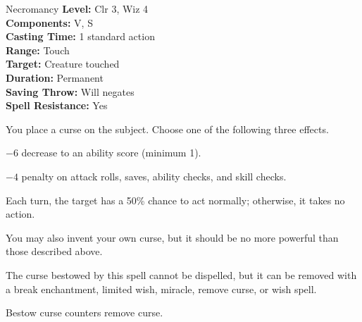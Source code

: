{Necromancy}
{
	\textbf{Level:}
	Clr 3, Wiz 4\\
	\textbf{Components:}
	V, S\\
	\textbf{Casting Time:}
	1 standard action\\
	\textbf{Range:}
	Touch\\
	\textbf{Target:}
	Creature touched\\
	\textbf{Duration:}
	Permanent\\
	\textbf{Saving Throw:}
	Will negates\\
	\textbf{Spell Resistance:}
	Yes\\
}
{
	You place a curse on the subject. Choose one of the following three effects.
\begin{itemize*}
\item $-6$ decrease to an ability score (minimum 1).
\item $-4$ penalty on attack rolls, saves, ability checks, and skill checks.
\item Each turn, the target has a 50\% chance to act normally; otherwise, it takes no action.
\end{itemize*}

	You may also invent your own curse, but it should be no more powerful than those described above.

	The curse bestowed by this spell cannot be dispelled, but it can be removed with a break enchantment, limited wish, miracle, remove curse, or wish spell.

	Bestow curse counters remove curse.

}
